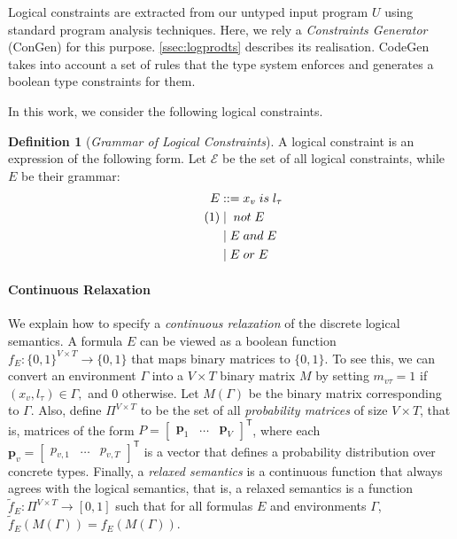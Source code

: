 \documentclass[sigplan,10pt,review,anonymous]{acmart} %
\newcommand\numberthis{\addtocounter{equation}{1}\tag{\theequation}}
\theoremstyle{plain}
\theoremstyle{remark}
\theoremstyle{definition}
\newtheorem{defn}{Definition}[section]
\begin{document}

Logical constraints are extracted from our untyped input program $U$ using
standard program analysis techniques.  Here, we rely a \emph{Constraints
	Generator} (ConGen) for this purpose.   \autoref{ssec:logprodts} describes its
realisation.  CodeGen takes into account a set of rules that the type system
enforces and generates a boolean type constraints for them.

In this work, we consider the following logical constraints.
\begin{defn}[\emph{Grammar of Logical Constraints}]\label{def:log-gram}
	A logical constraint is an expression of the following form.
	Let $\mathcal{E}$ be the set of all logical constraints, while $E$ be their grammar:
	\begin{align*}
		E & ::= x_v \mathrel{is} l_\tau \\ \numberthis\label{eq:gram}
		  & \mid{} \mathrel{not} E      \\
		  & \mid E \mathrel{and} E      \\
		  & \mid E \mathrel{or} E
	\end{align*}
\end{defn}
\paragraph{Continuous Relaxation}
We explain how to specify a \emph{continuous relaxation} of the discrete logical semantics.
A formula $E$ can be viewed as a boolean function $f_E: \{0, 1\}^{V \times T} \rightarrow \{0, 1\}$
that maps binary matrices to $\{0, 1\}$.
To see this, we can convert an environment
$\Gamma$ into a $V \times T$ binary matrix $M$ by setting $m_{v\tau} = 1$ if
$(x_v, l_\tau) \in \Gamma,$ and 0 otherwise.
Let $M(\Gamma)$ be the binary
matrix corresponding to $\Gamma$.
Also, define $\Pi^{V \times T}$ to be the set
of all \emph{probability matrices} of size $V \times T$,
that is, matrices of the form $P = \begin{bmatrix} \bm{p}_1 & \ldots & \bm{p}_{V} \end{bmatrix}^\mathsf{T}$,
where each $\bm{p}_v = \begin{bmatrix} p_{v,1} & \ldots & p_{v,{T}} \end{bmatrix}^\mathsf{T}$
is a vector that defines a probability distribution over concrete types.
Finally, a \emph{relaxed semantics} is a continuous function
that always agrees with the logical semantics, that is,
a relaxed semantics is a function
$\tilde{f}_{E} : \Pi^{V \times T}  \rightarrow [0, 1]$
such that for all formulas $E$ and environments $\Gamma$,
$\tilde{f}_{E}(M(\Gamma)) = f_E(M(\Gamma)).$
\end{document}
